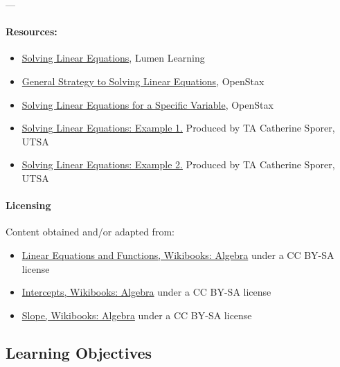 ---



\paragraph{Resources:}



\begin{itemize}
    \item \href{https://courses.lumenlearning.com/beginalgebra/chapter/introduction-to-solving-linear-equations/}{Solving Linear Equations}, Lumen Learning
    \item \href{https://openstax.org/books/intermediate-algebra-2e/pages/2-1-use-a-general-strategy-to-solve-linear-equations}{General Strategy to Solving Linear Equations}, OpenStax
    \item \href{https://openstax.org/books/intermediate-algebra-2e/pages/2-3-solve-a-formula-for-a-specific-variable}{Solving Linear Equations for a Specific Variable}, OpenStax
    \item \href{https://www.youtube.com/watch?v=bsGyJ0GeRy8}{Solving Linear Equations: Example 1.} Produced by TA Catherine Sporer, UTSA
    \item \href{https://www.youtube.com/watch?v=nGZcfHQEdqo}{Solving Linear Equations: Example 2.} Produced by TA Catherine Sporer, UTSA
\end{itemize}

\paragraph{Licensing}



Content obtained and/or adapted from:



\begin{itemize}
    \item \href{https://en.wikibooks.org/wiki/Algebra/Linear_Equations_and_Functions}{Linear Equations and Functions, Wikibooks: Algebra} under a CC BY-SA license
    \item \href{https://en.wikibooks.org/wiki/Algebra/Intercepts}{Intercepts, Wikibooks: Algebra} under a CC BY-SA license
    \item \href{https://en.wikibooks.org/wiki/Algebra/Slope}{Slope, Wikibooks: Algebra} under a CC BY-SA license
\end{itemize}

\subsection{Learning Objectives}

